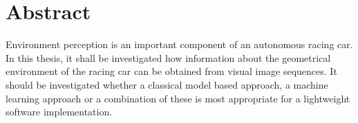 \chapter*{Abstract}

Environment perception is an important component of an autonomous racing car. In this thesis, it shall be investigated how information about the geometrical environment of the racing car can be obtained from visual image sequences. It should be investigated whether a classical model based approach, a machine learning approach or a combination of these is most appropriate for a lightweight software implementation.
